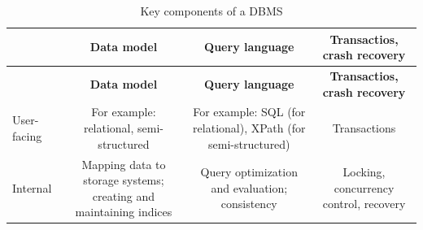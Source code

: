 \documentclass[]{krantz}
\begin{document}
\begin{longtable}[]{@{}lccc@{}}
\caption{\label{tab:table4-2} Key components of a DBMS}\tabularnewline
\toprule
\begin{minipage}[b]{0.07\columnwidth}\raggedright\strut
\strut
\end{minipage} & \begin{minipage}[b]{0.32\columnwidth}\centering\strut
\textbf{Data model}\strut
\end{minipage} & \begin{minipage}[b]{0.31\columnwidth}\centering\strut
\textbf{Query language}\strut
\end{minipage} & \begin{minipage}[b]{0.19\columnwidth}\centering\strut
\textbf{Transactios, crash recovery}\strut
\end{minipage}\tabularnewline
\midrule
\endfirsthead
\toprule
\begin{minipage}[b]{0.07\columnwidth}\raggedright\strut
\strut
\end{minipage} & \begin{minipage}[b]{0.32\columnwidth}\centering\strut
\textbf{Data model}\strut
\end{minipage} & \begin{minipage}[b]{0.31\columnwidth}\centering\strut
\textbf{Query language}\strut
\end{minipage} & \begin{minipage}[b]{0.19\columnwidth}\centering\strut
\textbf{Transactios, crash recovery}\strut
\end{minipage}\tabularnewline
\midrule
\endhead
\begin{minipage}[t]{0.07\columnwidth}\raggedright\strut
User-facing\strut
\end{minipage} & \begin{minipage}[t]{0.32\columnwidth}\centering\strut
For example: relational, semi-structured\strut
\end{minipage} & \begin{minipage}[t]{0.31\columnwidth}\centering\strut
For example: SQL (for relational), XPath (for semi-structured)\strut
\end{minipage} & \begin{minipage}[t]{0.19\columnwidth}\centering\strut
Transactions\strut
\end{minipage}\tabularnewline
\begin{minipage}[t]{0.07\columnwidth}\raggedright\strut
Internal\strut
\end{minipage} & \begin{minipage}[t]{0.32\columnwidth}\centering\strut
Mapping data to storage systems; creating and maintaining indices\strut
\end{minipage} & \begin{minipage}[t]{0.31\columnwidth}\centering\strut
Query optimization and evaluation; consistency\strut
\end{minipage} & \begin{minipage}[t]{0.19\columnwidth}\centering\strut
Locking, concurrency control, recovery\strut
\end{minipage}\tabularnewline
\bottomrule
\end{longtable}
\end{document}
